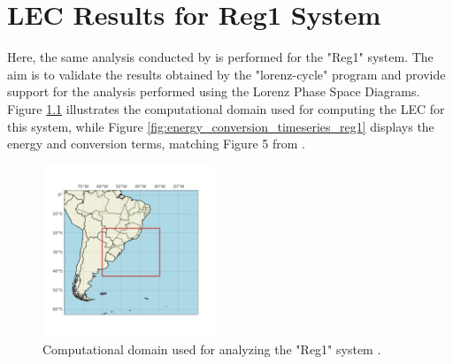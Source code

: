 \chapter{LEC Results for Reg1 System}\label{ap05}

Here, the same analysis conducted by \citet{dias2011energy} is performed for the "Reg1" system. The aim is to validate the results obtained by the "lorenz-cycle" program and provide support for the analysis performed using the Lorenz Phase Space Diagrams. Figure \ref{fig:box_limits_reg1} illustrates the computational domain used for computing the LEC for this system, while Figure \ref{fig:energy_conversion_timeseries_reg1} displays the energy and conversion terms, matching Figure 5 from \citet{dias2011energy}.

\begin{figure}[!htbp]
\centering
\includegraphics[width=0.46\textwidth]{figs_appendix/box_limits.png}
\caption[Computational Domain - Reg1 System]{Computational domain used for analyzing the "Reg1" system \citep{dias2011energy}.}
\label{fig:box_limits_reg1}
\end{figure}

